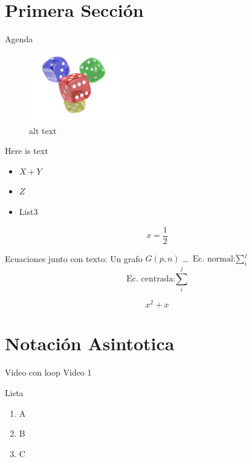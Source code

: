 \hypertarget{primera-secciuxf3n}{%
\section{Primera Sección}\label{primera-secciuxf3n}}

\begin{frame}{Agenda}
\protect\hypertarget{agenda}{}
\begin{figure}
\centering
\includegraphics[width=4cm]{img_1.png}
\caption{alt text}
\end{figure}

Here is text

\begin{itemize}
\tightlist
\item
  \(X + Y\)
\item
  \(Z\)
\item
  List3
\end{itemize}

\[x = \frac{1}{2}\]
\end{frame}

\begin{frame}{Ecuaciones junto con texto:}
\protect\hypertarget{ecuaciones-junto-con-texto}{}
Un grafo \(G(p, n)\) \ldots{} \(\text{Ec. normal:} \sum_i^j\)
\[\text{Ec. centrada:} \sum_i^j\]

\begin{equation}
x^2 + x
\end{equation}
\end{frame}

\hypertarget{notaciuxf3n-asintotica}{%
\section{Notación Asintotica}\label{notaciuxf3n-asintotica}}

\begin{frame}{Video con loop}
\protect\hypertarget{video-con-loop}{}
Video 1

\centering
{}

\begin{block}{Lista}
\protect\hypertarget{lista}{}
\begin{enumerate}
\tightlist
\item
  A
\item
  B
\item
  C
\end{enumerate}
\end{block}
\end{frame}

